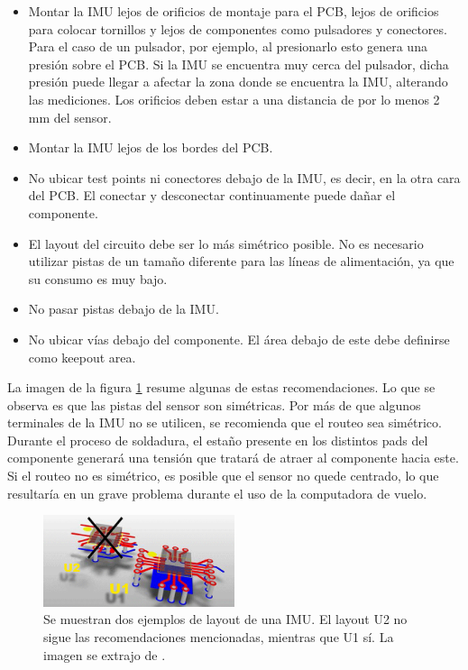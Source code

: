 \begin{itemize}
    \item Montar la IMU lejos de orificios de montaje para el PCB, lejos de orificios para colocar tornillos y lejos de componentes como pulsadores y conectores. Para el caso de un pulsador, por ejemplo, al presionarlo esto genera una presión sobre el PCB. Si la IMU se encuentra muy cerca del pulsador, dicha presión puede llegar a afectar la zona donde se encuentra la IMU, alterando las mediciones. Los orificios deben estar a una distancia de por lo menos 2 mm del sensor.
    \item Montar la IMU lejos de los bordes del PCB.
    \item No ubicar test points ni conectores debajo de la IMU, es decir, en la otra cara del PCB. El conectar y desconectar continuamente puede dañar el componente.
    \item El layout del circuito debe ser lo más simétrico posible. No es necesario utilizar pistas de un tamaño diferente para las líneas de alimentación, ya que su consumo es muy bajo.
    \item No pasar pistas debajo de la IMU.
    \item No ubicar vías debajo del componente. El área debajo de este debe definirse como keepout area.
\end{itemize}

La imagen de la figura \ref{fig:IMU_recomendaciones_layout} resume algunas de estas recomendaciones. Lo que se observa es que las pistas del sensor son simétricas. Por más de que algunos terminales de la IMU no se utilicen, se recomienda que el routeo sea simétrico. Durante el proceso de soldadura, el estaño presente en los distintos pads del componente generará una tensión que tratará de atraer al componente hacia este. Si el routeo no es simétrico, es posible que el sensor no quede centrado, lo que resultaría en un grave problema durante el uso de la computadora de vuelo.

\begin{figure}[H]
    \centering
    \includegraphics[width=0.5\textwidth]{img/IMU_recomendaciones_layout.png}
    \caption{Se muestran dos ejemplos de layout de una IMU. El layout U2 no sigue las recomendaciones mencionadas, mientras que U1 sí. La imagen se extrajo de \cite{IMUpcb_3}.}
    \label{fig:IMU_recomendaciones_layout}
\end{figure}

